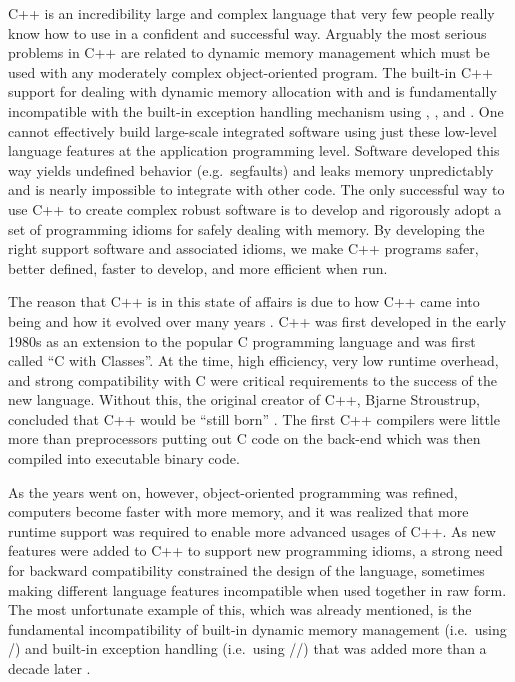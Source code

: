 \documentclass[pdf,ps2pdf,11pt]{SANDreport}
\begin{document}
C++ is an incredibility large and complex language that very few
people really know how to use in a confident and successful way.
Arguably the most serious problems in C++ are related to dynamic
memory management which must be used with any moderately complex
object-oriented program.  The built-in C++ support for dealing with
dynamic memory allocation with {} and {} is
fundamentally incompatible with the built-in exception handling
mechanism using {}, {}, and {}.  One
cannot effectively build large-scale integrated software using just
these low-level language features at the application programming
level.  Software developed this way yields undefined behavior (e.g.\
segfaults) and leaks memory unpredictably and is nearly impossible to
integrate with other code.  The only successful way to use C++ to
create complex robust software is to develop and rigorously adopt a
set of programming idioms for safely dealing with memory.  By
developing the right support software and associated idioms, we make
C++ programs safer, better defined, faster to develop, and more
efficient when run.

The reason that C++ is in this state of affairs is due to how C++ came
into being and how it evolved over many years {}\cite{stroustrup94,
stroustrup07}.  C++ was first developed in the early 1980s as an
extension to the popular C programming language and was first called
``C with Classes''.  At the time, high efficiency, very low runtime
overhead, and strong compatibility with C were critical requirements
to the success of the new language.  Without this, the original
creator of C++, Bjarne Stroustrup, concluded that C++ would be ``still
born'' {}\cite{stroustrup97}.  The first C++ compilers were little
more than preprocessors putting out C code on the back-end which was
then compiled into executable binary code.

As the years went on, however, object-oriented programming was
refined, computers become faster with more memory, and it was realized
that more runtime support was required to enable more advanced usages
of C++.  As new features were added to C++ to support new programming
idioms, a strong need for backward compatibility constrained the
design of the language, sometimes making different language features
incompatible when used together in raw form.  The most unfortunate
example of this, which was already mentioned, is the fundamental
incompatibility of built-in dynamic memory management (i.e.\ using
{}\ttt{new}/{}\ttt{delete}) and built-in exception handling (i.e.\
using {}/{}/{}) that was added more
than a decade later {}\cite{stroustrup94}.
\end{document}
